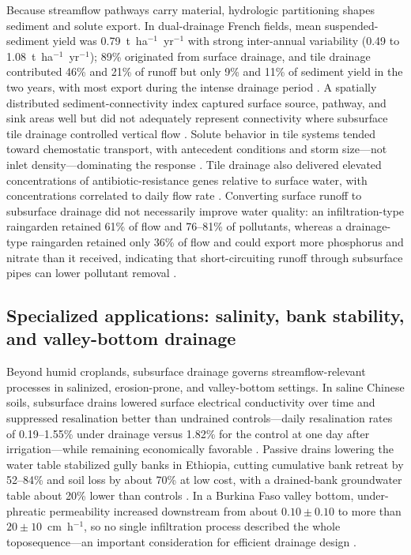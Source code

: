 \documentclass[11pt]{article}
\begin{document}
Because streamflow pathways carry material, hydrologic partitioning shapes sediment and solute export. In dual-drainage French fields, mean suspended-sediment yield was 0.79~t~ha$^{-1}$~yr$^{-1}$ with strong inter-annual variability (0.49 to 1.08~t~ha$^{-1}$~yr$^{-1}$); 89\% originated from surface drainage, and tile drainage contributed 46\% and 21\% of runoff but only 9\% and 11\% of sediment yield in the two years, with most export during the intense drainage period \parencite{Gaillot2023b,Grangeon2021}. A spatially distributed sediment-connectivity index captured surface source, pathway, and sink areas well but did not adequately represent connectivity where subsurface tile drainage controlled vertical flow \parencite{Calsamiglia2018}. Solute behavior in tile systems tended toward chemostatic transport, with antecedent conditions and storm size---not inlet density---dominating the response \parencite{Stops2022}. Tile drainage also delivered elevated concentrations of antibiotic-resistance genes relative to surface water, with concentrations correlated to daily flow rate \parencite{Rieke2018}. Converting surface runoff to subsurface drainage did not necessarily improve water quality: an infiltration-type raingarden retained 61\% of flow and 76--81\% of pollutants, whereas a drainage-type raingarden retained only 36\% of flow and could export more phosphorus and nitrate than it received, indicating that short-circuiting runoff through subsurface pipes can lower pollutant removal \parencite{Xu2022}.

\subsection{Specialized applications: salinity, bank stability, and valley-bottom drainage}

Beyond humid croplands, subsurface drainage governs streamflow-relevant processes in salinized, erosion-prone, and valley-bottom settings. In saline Chinese soils, subsurface drains lowered surface electrical conductivity over time and suppressed resalination better than undrained controls---daily resalination rates of 0.19--1.55\% under drainage versus 1.82\% for the control at one day after irrigation---while remaining economically favorable \parencite{Yan2013,Chang2012}. Passive drains lowering the water table stabilized gully banks in Ethiopia, cutting cumulative bank retreat by 52--84\% and soil loss by about 70\% at low cost, with a drained-bank groundwater table about 20\% lower than controls \parencite{Zegeye2021}. In a Burkina Faso valley bottom, under-phreatic permeability increased downstream from about $0.10\pm0.10$ to more than $20\pm10$~cm~h$^{-1}$, so no single infiltration process described the whole toposequence---an important consideration for efficient drainage design \parencite{Keita2014}.
\end{document}
